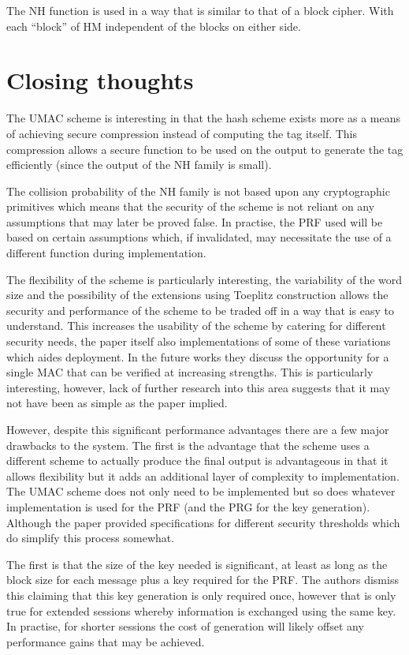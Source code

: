 \documentclass[10pt]{article} %
\begin{document}
The NH function is used in a way that is similar to that of a block cipher.
With each ``block'' of HM independent of the blocks on either side. 


\section{Closing thoughts}

The UMAC scheme is interesting in that the hash scheme exists more as a means
of achieving secure compression instead of computing the tag itself. This
compression allows a secure function to be used on the output to generate the
tag efficiently (since the output of the NH family is small).

The collision probability of the NH family is not based upon any cryptographic
primitives which means that the security of the scheme is not reliant on any
assumptions that may later be proved false. In practise, the PRF used will be
based on certain assumptions which, if invalidated, may necessitate the use of
a different function during implementation.

The flexibility of the scheme is particularly interesting, the variability of
the word size and the possibility of the extensions using Toeplitz construction
allows the security and performance of the scheme to be traded off in a way
that is easy to understand. This increases the usability of the scheme by
catering for different security needs, the paper itself also implementations of
some of these variations which aides deployment. In the future works they discuss the opportunity
for a single MAC that can be verified at increasing strengths. This is
particularly interesting, however, lack of further research into this area
suggests that it may not have been as simple as the paper implied.

However, despite this significant performance advantages there are a few major
drawbacks to the system. The first is the advantage that the scheme uses a
different scheme to actually produce the final output is advantageous in that
it allows flexibility but it adds an additional layer of complexity to
implementation. The UMAC scheme does not only need to be implemented but so does
whatever implementation is used for the PRF (and the PRG for the key
generation). Although the paper provided specifications for different security
thresholds which do simplify this process somewhat.

The first is that the size of the key needed is
significant, at least as long as the block size for each message plus a key
required for the PRF. The authors
dismiss this claiming that this key generation is only required once, however
that is only true for extended sessions whereby information is exchanged using
the same key. In practise, for shorter sessions the cost of generation will
likely offset any performance gains that may be achieved.
\end{document}
